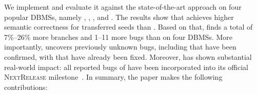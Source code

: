 \documentclass[sigconf,review,anonymous]{acmart}
\begin{document}
We implement \tool{} and evaluate it against the state-of-the-art approach \sedar{} on four popular DBMSs, namely \duckdb{}, \clickhouse{}, \monetdb{}, and \virtuoso{}.
The results show that \tool{} achieves \translateratio{} higher semantic correctness for transferred seeds than \sedar{}.
Based on that, \tool{} finds a total of 7\%--26\% more branches and 1--11 more bugs than \sedar{} on four DBMSs. 
More importantly, \tool{} uncovers \bugcnt{} previously unknown bugs, including \bugconfirmcnt{} that have been confirmed, with \bugfixcnt{} that have already been fixed.
Moreover, \tool{} has shown substantial real-world impact: all reported bugs of \monetdb{} have been incorporated into its official \textsc{NextRelease} milestone~\cite{monetdb-nextrelease}.
In summary, the paper makes the following contributions:
\end{document}
